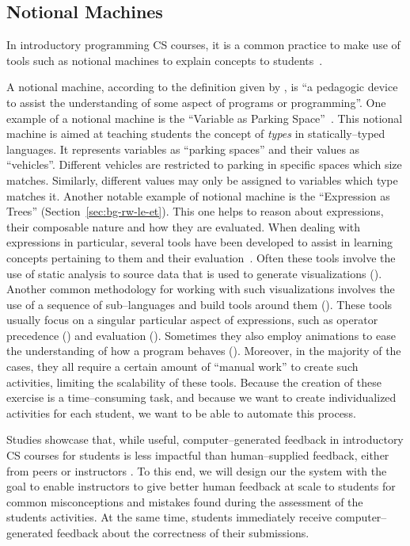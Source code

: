 \begin{chapterBody}
\section{Notional Machines}

In introductory programming CS courses, it is a common practice to make use of
tools such as notional machines to explain concepts to 
students~\cite{donaldson_flexible_2018, aalvik_visast_2019,
fincher_notional_2020}.

A notional machine, according to the definition given by 
\citet{fincher_notional_2020}, is ``a pedagogic device to assist the 
understanding of some aspect of programs or programming''.
One example of a notional machine is the ``Variable as Parking
Space''~\cite{fincher_notional_2020}. This notional machine is aimed at teaching
students the concept of \textit{types} in statically–typed languages.
It represents variables as ``parking spaces'' and their values as ``vehicles''.
Different vehicles are restricted to parking in specific spaces which size
matches. Similarly, different values may only be assigned to variables which
type matches it.
Another notable example of notional machine is the ``Expression as Trees''
(Section~\ref{sec:bg-rw-le-et}). This one helps to reason about expressions,
their composable nature and how they are evaluated.
When dealing with expressions in particular, several tools have been developed
to assist in learning concepts pertaining to them and their 
evaluation~\cite{donaldson_flexible_2018}.
Often these tools involve the use of static analysis to source data that is used
to generate visualizations
(\citet{sirkia_exploring_2014, kumar_effectiveness_2015}).
Another common methodology for working with such visualizations involves the
use of a sequence of sub–languages and build tools around them
(\citet{felleisen_how_2014, henz_stepper_2021}).
These tools usually focus on a singular particular aspect of expressions, such
as operator precedence (\citet{sychev_tool_2022}) and evaluation 
(\citet{clements_modeling_2001}). Sometimes they also employ animations to ease
the understanding of how a program behaves
(\citet{dave_berry_generating_1991}).
Moreover, in the majority of the cases, they all require a certain amount of
``manual work'' to create such activities, limiting the scalability of these
tools.
Because the creation of these exercise is a time–consuming task, and because we
want to create individualized activities for each student, we want to be able
to automate this process.

Studies showcase that, while useful, computer–generated feedback in 
introductory CS courses for students is less impactful than human–supplied
feedback, either from peers or instructors
\cite{leite_effects_2020, pieterse_automated_2013}.
To this end, we will design our the system with the goal to enable instructors
to give better human feedback at scale to students for common misconceptions
and mistakes found during the assessment of the students activities.
At the same time, students immediately receive computer–generated feedback
about the correctness of their submissions.


\end{chapterBody}
